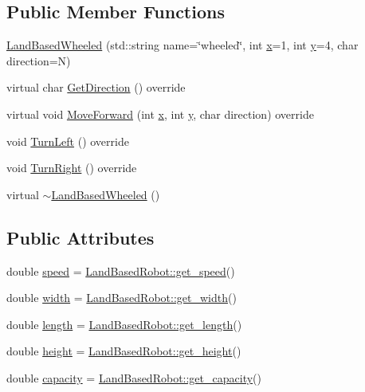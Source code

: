 \subsection*{Public Member Functions}
\begin{DoxyCompactItemize}
\item 
\hyperlink{classfp_1_1_land_based_wheeled_a0fe67f1df86ad377e0ef9d64a64f9416}{Land\+Based\+Wheeled} (std\+::string name=\char`\"{}wheeled\char`\"{}, int \hyperlink{classfp_1_1_land_based_robot_a305bb45b4478ab51080fa0d7fc7bc2d7}{x}=1, int \hyperlink{classfp_1_1_land_based_robot_ad1ff889538680eba6bc6eb135b4ccd63}{y}=4, char direction=\textquotesingle{}N\textquotesingle{})
\item 
virtual char \hyperlink{classfp_1_1_land_based_wheeled_adaafaceb388374ffb9cec28301665492}{Get\+Direction} () override
\item 
virtual void \hyperlink{classfp_1_1_land_based_wheeled_a90ab977baecc518185c950b08c56dfc5}{Move\+Forward} (int \hyperlink{classfp_1_1_land_based_robot_a305bb45b4478ab51080fa0d7fc7bc2d7}{x}, int \hyperlink{classfp_1_1_land_based_robot_ad1ff889538680eba6bc6eb135b4ccd63}{y}, char direction) override
\item 
void \hyperlink{classfp_1_1_land_based_wheeled_a240c5e9cf72006ac2f99f8e1dfc4dc5d}{Turn\+Left} () override
\item 
void \hyperlink{classfp_1_1_land_based_wheeled_a505f5c33f04681aa5c7362531947f4ca}{Turn\+Right} () override
\item 
virtual \hyperlink{classfp_1_1_land_based_wheeled_a932593879ef390bf1b019ddb3cfa604d}{$\sim$\+Land\+Based\+Wheeled} ()
\end{DoxyCompactItemize}
\subsection*{Public Attributes}
\begin{DoxyCompactItemize}
\item 
double \hyperlink{classfp_1_1_land_based_wheeled_aaab6e766362d75c7e52a183256123a36}{speed} = \hyperlink{classfp_1_1_land_based_robot_a44fed3a00505f6679ff8505aebae4505}{Land\+Based\+Robot\+::get\+\_\+speed}()
\item 
double \hyperlink{classfp_1_1_land_based_wheeled_af340cd88db06fdbb837eddedf7ec9c14}{width} = \hyperlink{classfp_1_1_land_based_robot_a523b439167030a7ab1e0e7f6c8d42315}{Land\+Based\+Robot\+::get\+\_\+width}()
\item 
double \hyperlink{classfp_1_1_land_based_wheeled_a99e87d729bfd9bee5924a387a11052e6}{length} = \hyperlink{classfp_1_1_land_based_robot_adb03fbded9a3b0553301bcc0322cb1c1}{Land\+Based\+Robot\+::get\+\_\+length}()
\item 
double \hyperlink{classfp_1_1_land_based_wheeled_ae56bdd84440e468928e4f416394d5dde}{height} = \hyperlink{classfp_1_1_land_based_robot_ac77253c989c417ee26654541c50669d4}{Land\+Based\+Robot\+::get\+\_\+height}()
\item 
double \hyperlink{classfp_1_1_land_based_wheeled_a724d9e2b23926f461d8afea8311707e3}{capacity} = \hyperlink{classfp_1_1_land_based_robot_a24c0f6d395f3dfd6bdbcf5a2a9801de1}{Land\+Based\+Robot\+::get\+\_\+capacity}()
\end{DoxyCompactItemize}
